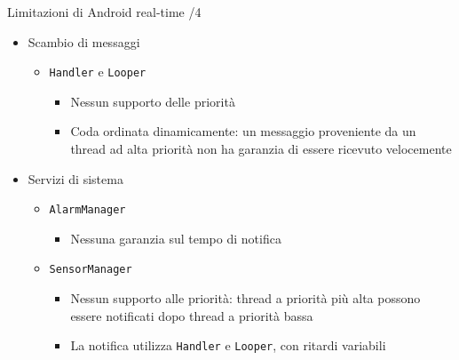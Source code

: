 \begin{frame}{Limitazioni di Android real-time /4}
	\begin{itemize}
		\item Scambio di messaggi
		\begin{itemize}
			\item \texttt{Handler} e \texttt{Looper}
			\begin{itemize}
				\item Nessun supporto delle priorità
				\item Coda ordinata dinamicamente: un messaggio proveniente da un thread ad alta priorità non ha garanzia di essere ricevuto velocemente
			\end{itemize}
		\end{itemize}
		\item Servizi di sistema
		\begin{itemize}
			\item \texttt{AlarmManager}
			\begin{itemize}
				\item Nessuna garanzia sul tempo di notifica
			\end{itemize}
			\item \texttt{SensorManager}
			\begin{itemize}
				\item Nessun supporto alle priorità: thread a priorità più alta possono essere notificati dopo thread a priorità bassa
				\item La notifica utilizza \texttt{Handler} e \texttt{Looper}, con ritardi variabili
			\end{itemize}
		\end{itemize}
	\end{itemize}
\end{frame}